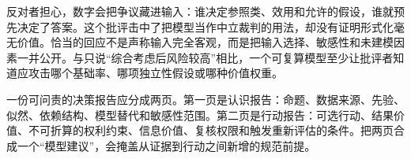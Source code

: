反对者担心，数字会把争议藏进输入：谁决定参照类、效用和允许的假设，谁就预先决定了答案。这个批评击中了把模型当作中立裁判的用法，却没有证明形式化毫无价值。恰当的回应不是声称输入完全客观，而是把输入选择、敏感性和未建模因素一并公开。与只说“综合考虑后风险较高”相比，一个可复算模型至少让批评者知道应攻击哪个基础率、哪项独立性假设或哪种价值权重。

\begin{argumentbox}
一份可问责的决策报告应分成两页。第一页是认识报告：命题、数据来源、先验、似然、依赖结构、模型替代和敏感性范围。第二页是行动报告：可选行动、结果价值、不可折算的权利约束、信息价值、复核权限和触发重新评估的条件。把两页合成一个“模型建议”，会掩盖从证据到行动之间新增的规范前提。
\end{argumentbox}

